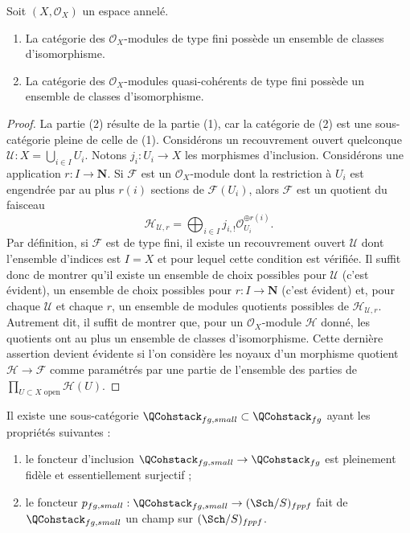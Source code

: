 \begin{lemma}
\label{lemma-finite-type}
Soit $(X, \mathcal{O}_X)$ un espace annelé.
\begin{enumerate}
\item La catégorie des $\mathcal{O}_X$-modules de type fini possède un
ensemble de classes d'isomorphisme.
\item La catégorie des $\mathcal{O}_X$-modules quasi-cohérents
de type fini possède un ensemble de classes d'isomorphisme.
\end{enumerate}
\end{lemma}

\begin{proof}
La partie (2) résulte de la partie (1), car la catégorie de (2) est une sous-catégorie
pleine de celle de (1). Considérons un recouvrement ouvert quelconque
$\mathcal{U} : X = \bigcup_{i \in I} U_i$. Notons $j_i : U_i \to X$
les morphismes d'inclusion. Considérons une application $r : I \to \mathbf{N}$.
Si $\mathcal{F}$ est un $\mathcal{O}_X$-module dont la restriction à
$U_i$ est engendrée par au plus $r(i)$ sections de $\mathcal{F}(U_i)$,
alors $\mathcal{F}$ est un quotient du faisceau
$$
\mathcal{H}_{\mathcal{U}, r} =
\bigoplus\nolimits_{i \in I} j_{i, !}\mathcal{O}_{U_i}^{\oplus r(i)}.
$$
Par définition, si $\mathcal{F}$ est de type fini, il existe
un recouvrement ouvert $\mathcal{U}$ dont l'ensemble d'indices est $I = X$
et pour lequel cette condition est vérifiée. Il suffit donc de montrer qu'il existe
un ensemble de choix possibles pour $\mathcal{U}$ (c'est évident),
un ensemble de choix possibles pour $r : I \to \mathbf{N}$ (c'est évident) et,
pour chaque $\mathcal{U}$ et chaque $r$, un ensemble de modules quotients possibles
de $\mathcal{H}_{\mathcal{U}, r}$. Autrement dit, il suffit de montrer
que, pour un $\mathcal{O}_X$-module $\mathcal{H}$ donné, les quotients ont
au plus un ensemble de classes d'isomorphisme.
Cette dernière assertion devient évidente
si l'on considère les noyaux d'un morphisme quotient
$\mathcal{H} \to \mathcal{F}$
comme paramétrés par une partie de l'ensemble des parties de
$\prod_{U \subset X\text{ open}} \mathcal{H}(U)$.
\end{proof}

\begin{lemma}
\label{lemma-stack-fg-quasi-coherent}
Il existe une sous-catégorie
$\QCohstack_{fg, small} \subset \QCohstack_{fg}$
ayant les propriétés suivantes :
\begin{enumerate}
\item le foncteur d'inclusion
$\QCohstack_{fg, small} \to \QCohstack_{fg}$ est
pleinement fidèle et essentiellement surjectif ;
\item le foncteur
$p_{fg, small} : \QCohstack_{fg, small} \to (\Sch/S)_{fppf}$
fait de $\QCohstack_{fg, small}$ un champ sur $(\Sch/S)_{fppf}$.
\end{enumerate}
\end{lemma}

